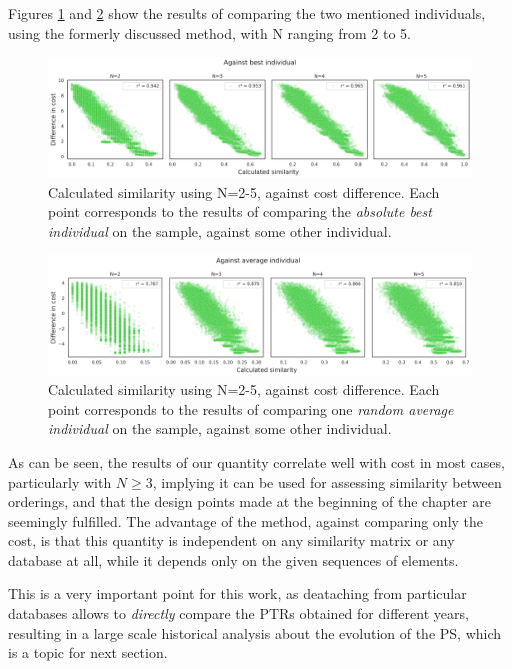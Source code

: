 \documentclass[article]{article}
\begin{document}
Figures \ref{fig:metric_bestInd} and \ref{fig:metric_avgInd} show the results of comparing the two mentioned individuals, using the formerly discussed method, with N ranging from 2 to 5.

\begin{figure}[h!]
  \centering
	\includegraphics[width=18.0cm]{metric_Against_best_individual.png}
	\caption{Calculated similarity using N=2-5, against cost difference. Each point corresponds to the results of comparing the \textit{absolute best individual} on the sample, against some other individual.}
	\label{fig:metric_bestInd}
\end{figure}

\begin{figure}[h!]
  \centering
	\includegraphics[width=18.0cm]{metric_Against_average_individual.png}
	\caption{Calculated similarity using N=2-5, against cost difference. Each point corresponds to the results of comparing one \textit{random average individual} on the sample, against some other individual.}
	\label{fig:metric_avgInd}
\end{figure}

As can be seen, the results of our quantity correlate well with cost in most cases, particularly with $N \geq 3$, implying it can be used for assessing similarity between orderings, and that the design points made at the beginning of the chapter are seemingly fulfilled. The advantage of the method, against comparing only the cost, is that this quantity is independent on any similarity matrix or any database at all, while it depends only on the given sequences of elements. 

This is a very important point for this work, as deataching from particular databases allows to \textit{directly} compare the PTRs obtained for different years, resulting in a large scale historical analysis about the evolution of the PS, which is a topic for next section.
\end{document}
